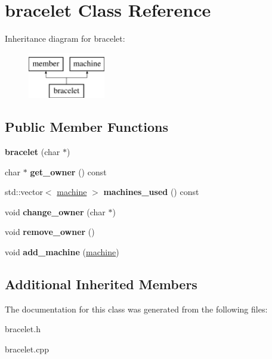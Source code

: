 \hypertarget{classbracelet}{\section{bracelet Class Reference}
\label{classbracelet}
}
Inheritance diagram for bracelet\-:\begin{figure}[H]
\begin{center}
\leavevmode
\includegraphics[height=2.000000cm]{classbracelet}
\end{center}
\end{figure}
\subsection*{Public Member Functions}
\begin{DoxyCompactItemize}
\item 
\hypertarget{classbracelet_a51b4e2907d3bd742bed3c5af8fb58e41}{{\bfseries bracelet} (char $\ast$)}\label{classbracelet_a51b4e2907d3bd742bed3c5af8fb58e41}

\item 
\hypertarget{classbracelet_a220850e5494aea041478ba50540ea58f}{char $\ast$ {\bfseries get\-\_\-owner} () const }\label{classbracelet_a220850e5494aea041478ba50540ea58f}

\item 
\hypertarget{classbracelet_a5df367d5e2c766f8070d892ed0735858}{std\-::vector$<$ \hyperlink{classmachine}{machine} $>$ {\bfseries machines\-\_\-used} () const }\label{classbracelet_a5df367d5e2c766f8070d892ed0735858}

\item 
\hypertarget{classbracelet_a7b27c0f1916a5a2ca1036e2f966ad431}{void {\bfseries change\-\_\-owner} (char $\ast$)}\label{classbracelet_a7b27c0f1916a5a2ca1036e2f966ad431}

\item 
\hypertarget{classbracelet_af335417478ad987d9df5521c430ac59d}{void {\bfseries remove\-\_\-owner} ()}\label{classbracelet_af335417478ad987d9df5521c430ac59d}

\item 
\hypertarget{classbracelet_a39485b59c215f4952da18b3bdb5aede0}{void {\bfseries add\-\_\-machine} (\hyperlink{classmachine}{machine})}\label{classbracelet_a39485b59c215f4952da18b3bdb5aede0}

\end{DoxyCompactItemize}
\subsection*{Additional Inherited Members}


The documentation for this class was generated from the following files\-:\begin{DoxyCompactItemize}
\item 
bracelet.\-h\item 
bracelet.\-cpp\end{DoxyCompactItemize}
